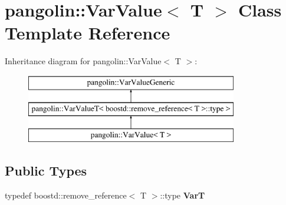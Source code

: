 \hypertarget{classpangolin_1_1_var_value}{}\section{pangolin\+:\+:Var\+Value$<$ T $>$ Class Template Reference}
\label{classpangolin_1_1_var_value}
Inheritance diagram for pangolin\+:\+:Var\+Value$<$ T $>$\+:\begin{figure}[H]
\begin{center}
\leavevmode
\includegraphics[height=3.000000cm]{classpangolin_1_1_var_value}
\end{center}
\end{figure}
\subsection*{Public Types}
\begin{DoxyCompactItemize}
\item 
typedef boostd\+::remove\+\_\+reference$<$ T $>$\+::type {\bfseries VarT}\hypertarget{classpangolin_1_1_var_value_aa1822b992c750c2a08eeb4fb5e1162b0}{}\label{classpangolin_1_1_var_value_aa1822b992c750c2a08eeb4fb5e1162b0}

\end{DoxyCompactItemize}
